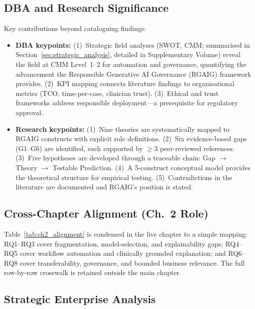 \subsection{DBA and Research Significance}

Key contributions beyond cataloguing findings:

\begin{itemize}
    \item \textbf{DBA keypoints:} (1)~Strategic field analyses (SWOT, CMM; summarised in Section~\ref{sec:strategic_analysis}, detailed in Supplementary Volume) reveal the field at CMM Level~1--2 for automation and governance, quantifying the advancement the Responsible Generative AI Governance (RGAIG) framework provides. (2)~KPI mapping connects literature findings to organisational metrics (TCO, time-per-case, clinician trust). (3)~Ethical and trust frameworks address responsible deployment---a prerequisite for regulatory approval.
    \item \textbf{Research keypoints:} (1)~Nine theories are systematically mapped to RGAIG constructs with explicit role definitions. (2)~Six evidence-based gaps (G1--G6) are identified, each supported by $\geq$3 peer-reviewed references. (3)~Five hypotheses are developed through a traceable chain: Gap $\to$ Theory $\to$ Testable Prediction. (4)~A 5-construct conceptual model provides the theoretical structure for empirical testing. (5)~Contradictions in the literature are documented and RGAIG's position is stated.
\end{itemize}

\subsection{Cross-Chapter Alignment (Ch.~2 Role)}

Table~\ref{tab:ch2_alignment} is condensed in the live chapter to a simple mapping: RQ1--RQ3 cover fragmentation, model-selection, and explainability gaps; RQ4--RQ5 cover workflow automation and clinically grounded explanation; and RQ6--RQ8 cover transferability, governance, and bounded business relevance. The full row-by-row crosswalk is retained outside the main chapter.

\subsection{Strategic Enterprise Analysis}

